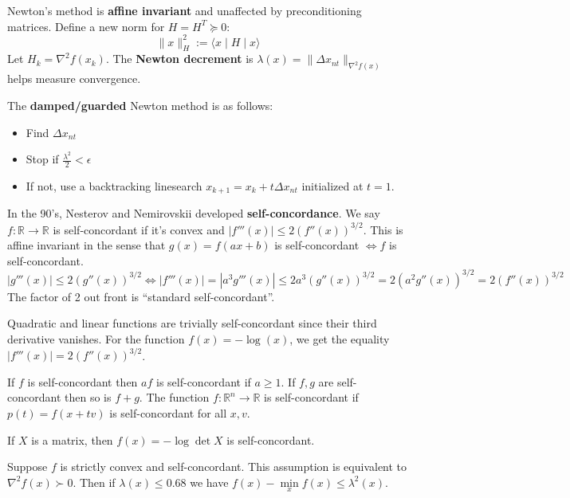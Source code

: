 \documentclass[english, 11pt]{article}
\begin{document}
\begin{rem}
Newton's method is {\bf affine invariant} and unaffected by preconditioning matrices. Define a new norm for $H = H^T \succeq 0$:
\[
\|x\|_H^2 := \langle x \mid H \mid x \rangle
\]
Let $H_k = \nabla^2 f(x_k)$. The {\bf Newton decrement} is $\lambda(x) = \| \Delta x_{nt} \|_{ \nabla^2 f(x)}$ helps measure convergence.

\end{rem}


The {\bf damped/guarded} Newton method is as follows:
\begin{itemize}
\item Find $\Delta x_{nt}$
\item Stop if $\frac{\lambda^2}{2}<\epsilon$
\item If not, use a backtracking linesearch $x_{k+1} = x_k + t \Delta x_{nt}$ initialized at $t=1$.
\end{itemize}

In the 90's, Nesterov and Nemirovskii developed {\bf self-concordance}. We say $f:\mathbb{R} \to \mathbb{R}$ is self-concordant if it's convex and $|f'''(x)| \le 2 \left( f''(x) \right)^{3/2}$. This is affine invariant in the sense that $g(x) = f(ax + b)$ is self-concordant $\iff f$ is self-concordant. 
\[
|g'''(x)| \le 2 ( g''(x) )^{3/2} \iff  |f'''(x)| = | a^3 g'''(x) | \le 2a^3 (g''(x))^{3/2} = 2(a^2 g''(x))^{3/2} = 2 (f''(x))^{3/2}
\]
The factor of 2 out front is ``standard self-concordant''. 
\begin{exmp}
Quadratic and linear functions are trivially self-concordant since their third derivative vanishes. For the function $f(x) =  - \log(x)$, we get the equality $|f'''(x)| = 2 (f''(x))^{3/2}$.
\end{exmp}

\begin{rem}
If $f$ is self-concordant then $af$ is self-concordant if $a \ge 1$. If $f,g$ are self-concordant then so is $f+g$. The function $f:\mathbb{R}^n \to \mathbb{R}$ is self-concordant if $p(t) = f(x+tv)$ is self-concordant for all $x,v$. 
\end{rem}

\begin{exmp}
If $X$ is a matrix, then $f(x) = - \log \det X$ is self-concordant.
\end{exmp}

\begin{rem}
Suppose $f$ is strictly convex and self-concordant. This assumption is equivalent to $\nabla^2 f(x) \succ 0$. Then if $\lambda(x) \le 0.68$ we have $f(x) - \min \limits_x f(x) \le \lambda^2(x)$.
\end{rem}
\end{document}
